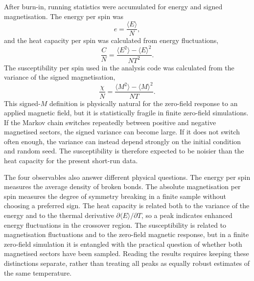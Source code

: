 \documentclass[twoside,twocolumn,9pt]{extarticle}
\begin{document}
After burn-in, running statistics were accumulated for energy and signed magnetisation. The energy per spin was
\begin{equation}
  e=\frac{\langle E\rangle}{N},
  \label{eq:eper_spin}
\end{equation}
and the heat capacity per spin was calculated from energy fluctuations,
\begin{equation}
  \frac{C}{N} = \frac{\langle E^2\rangle-\langle E\rangle^2}{N T^2}.
  \label{eq:heatcapacity}
\end{equation}
The susceptibility per spin used in the analysis code was calculated from the variance of the signed magnetisation,
\begin{equation}
  \frac{\chi}{N} = \frac{\langle M^2\rangle-\langle M\rangle^2}{N T}.
  \label{eq:susceptibility}
\end{equation}
This signed-\(M\) definition is physically natural for the zero-field response to an applied magnetic field, but it is statistically fragile in finite zero-field simulations. If the Markov chain switches repeatedly between positive and negative magnetised sectors, the signed variance can become large. If it does not switch often enough, the variance can instead depend strongly on the initial condition and random seed. The susceptibility is therefore expected to be noisier than the heat capacity for the present short-run data.

The four observables also answer different physical questions. The energy per spin measures the average density of broken bonds. The absolute magnetisation per spin measures the degree of symmetry breaking in a finite sample without choosing a preferred sign. The heat capacity is related both to the variance of the energy and to the thermal derivative \(\partial\langle E\rangle/\partial T\), so a peak indicates enhanced energy fluctuations in the crossover region. The susceptibility is related to magnetisation fluctuations and to the zero-field magnetic response, but in a finite zero-field simulation it is entangled with the practical question of whether both magnetised sectors have been sampled. Reading the results requires keeping these distinctions separate, rather than treating all peaks as equally robust estimates of the same temperature.
\end{document}
